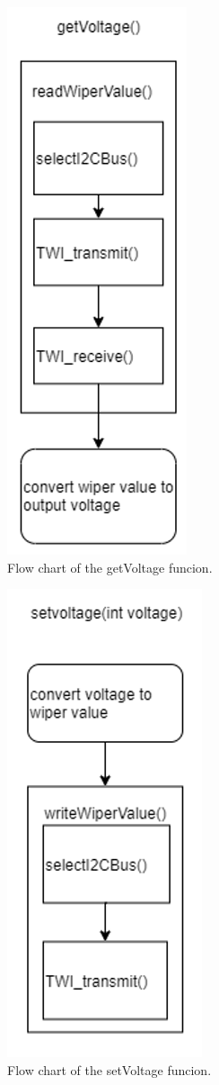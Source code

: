 \begin{figure}[h]
    \centering
    \includegraphics[scale=0.5]{software_getVoltage_flow_chart.png}
    \caption{Flow chart of the getVoltage funcion.}
\end{figure}

\begin{figure}[h]
    \centering
    \includegraphics[scale=0.5]{software_setVoltage_flow_chart.png}
    \caption{Flow chart of the setVoltage funcion.}
\end{figure}

